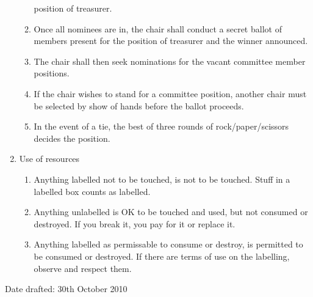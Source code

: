 \documentclass{article}
\begin{document}
\begin{enumerate}
\begin{enumerate}
    position of treasurer.
  \item Once all nominees are in, the chair shall conduct a secret
    ballot of members present for the position of treasurer and the
    winner announced.
  \item The chair shall then seek nominations for the vacant committee
    member positions.
  \item If the chair wishes to stand for a committee position, another
    chair must be selected by show of hands before the ballot proceeds.
  \item In the event of a tie, the best of three rounds of
    rock/paper/scissors decides the position.
  \end{enumerate}
\item Use of resources
  \begin{enumerate}
  \item Anything labelled not to be touched, is not to be
    touched. Stuff in a labelled box counts as labelled.
  \item Anything unlabelled is OK to be touched and used, but not consumed or destroyed. If you break it, you pay for it or replace it.
  \item Anything labelled as permissable to consume or destroy, is
    permitted to be consumed or destroyed. If there are terms of use
    on the labelling, observe and respect them.
  \end{enumerate}
  
\end{enumerate}
\bigskip
Date drafted: 30th October 2010
\end{document}

